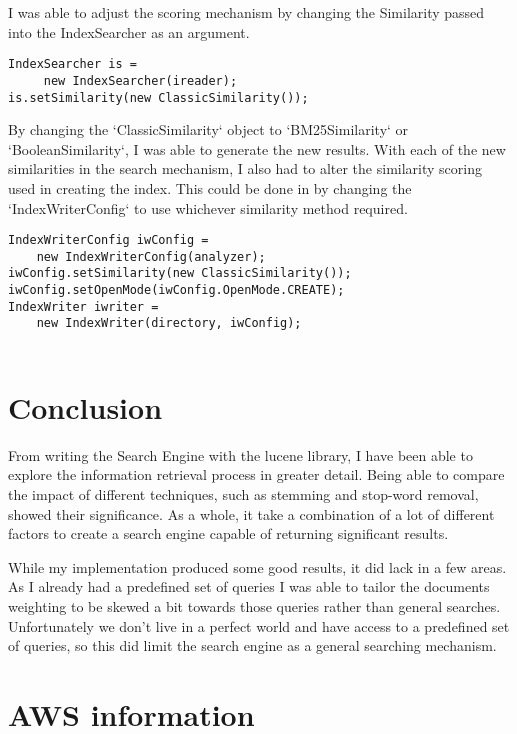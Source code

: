 I was able to adjust the scoring mechanism by changing the Similarity passed into the IndexSearcher as an argument.
\begin{lstlisting}
IndexSearcher is = 
	 new IndexSearcher(ireader);
is.setSimilarity(new ClassicSimilarity());
\end{lstlisting}
By changing the `ClassicSimilarity` object to `BM25Similarity` or `BooleanSimilarity`, I was able to generate the new results. With each of the new similarities in the search mechanism, I also had to alter the similarity scoring used in creating the index. This could be done in by changing the `IndexWriterConfig` to use whichever similarity method required. 
\begin{lstlisting}
IndexWriterConfig iwConfig = 
	new IndexWriterConfig(analyzer);
iwConfig.setSimilarity(new ClassicSimilarity());
iwConfig.setOpenMode(iwConfig.OpenMode.CREATE);
IndexWriter iwriter = 
	new IndexWriter(directory, iwConfig);
	
\end{lstlisting}
\newpage

\section{Conclusion}
From writing the Search Engine with the lucene library, I have been able to explore the information retrieval process in greater detail. Being able to compare the impact of different techniques, such as stemming and stop-word removal, showed their significance. As a whole, it take a combination of a lot of different factors to create a search engine capable of returning significant results. \par
While my implementation produced some good results, it did lack in a few areas. As I already had a predefined set of queries I was able to tailor the documents weighting to be skewed a bit towards those queries rather than general searches. Unfortunately we don't live in a perfect world and have access to a predefined set of queries, so this did limit the search engine as a general searching mechanism. 

\section{AWS information}

